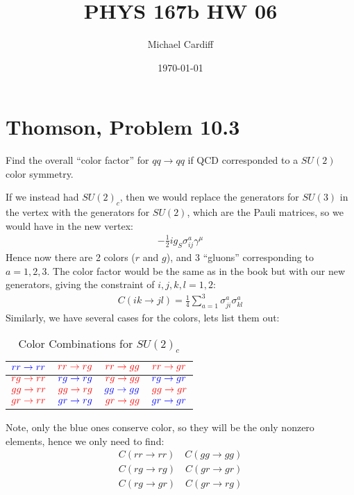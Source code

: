 \documentclass[12pt]{article}
\title{\vspace{-3em}PHYS 167b HW 06}
\author{Michael Cardiff}
\date{\today}
\begin{document}
\maketitle
\section{Thomson, Problem 10.3}
\begin{problem}
  Find the overall ``color factor'' for $qq\to qq$ if QCD corresponded to a $SU(2)$ color symmetry.
\end{problem}
If we instead had ${SU(2)}_c$, then we would replace the generators for $SU(3)$ in the vertex with the generators for $SU(2)$, which are the Pauli matrices, so we would have in the new vertex:
\begin{align*}
  -\frac12ig_S\sigma^a_{ij}\gamma^\mu
\end{align*}
Hence now there are 2 colors ($r$ and $g$), and 3 ``gluons'' corresponding to $a=1,2,3$. The color factor would be the same as in the book but with our new generators, giving the constraint of $i,j,k,l=1,2$:
\begin{align*}
  C(ik\to jl)=\frac14\sum_{a=1}^3\sigma^a_{ji}\sigma^a_{kl}
\end{align*}
Similarly, we have several cases for the colors, lets list them out:
\begin{table}[H]
  \centering
  \begin{tabular}{cccc}
    ${\color{blue}rr\to rr}$ & ${\color{red}rr\to rg}$
    &${\color{red}rr\to gg}$ & ${\color{red}rr\to gr}$\\\midrule
    ${\color{red}rg\to rr}$ & ${\color{blue}rg\to rg}$
    & ${\color{red}rg\to gg}$ & ${\color{blue}rg\to gr}$\\\midrule
    ${\color{red}gg\to rr}$ & ${\color{red}gg\to rg}$ 
    & ${\color{blue}gg\to gg}$ & ${\color{red}gg\to gr}$\\\midrule
    ${\color{red}gr\to rr}$ & ${\color{blue}gr\to rg}$ 
    & ${\color{red}gr\to gg}$ & ${\color{blue}gr\to gr}$
  \end{tabular}
  \caption{Color Combinations for ${SU(2)}_c$}
\end{table}
Note, only the {\color{blue}blue} ones conserve color, so they will be the only nonzero elements, hence we only need to find:
\begin{align*}
  C(rr\to rr)\quad C(gg\to gg)\\
  C(rg\to rg)\quad C(gr\to gr)\\
  C(rg\to gr)\quad C(gr\to rg)
\end{align*}
\end{document}
